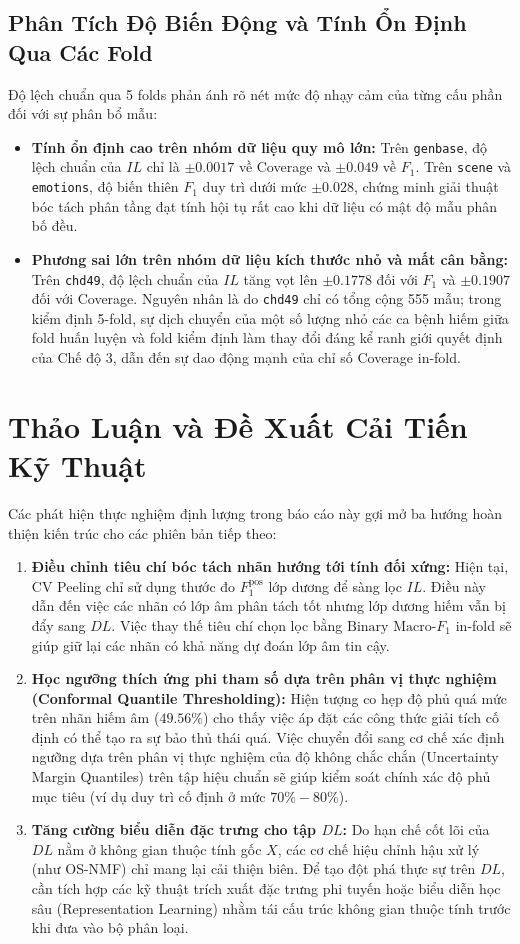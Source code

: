 \documentclass[10pt,a4paper]{article}
\begin{document}
\subsection{Phân Tích Độ Biến Động và Tính Ổn Định Qua Các Fold}
Độ lệch chuẩn qua 5 folds phản ánh rõ nét mức độ nhạy cảm của từng cấu phần đối với sự phân bổ mẫu:
\begin{itemize}[leftmargin=*]
    \item \textbf{Tính ổn định cao trên nhóm dữ liệu quy mô lớn:} Trên \texttt{genbase}, độ lệch chuẩn của $IL$ chỉ là $\pm 0.0017$ về Coverage và $\pm 0.049$ về $F_1$. Trên \texttt{scene} và \texttt{emotions}, độ biến thiên $F_1$ duy trì dưới mức $\pm 0.028$, chứng minh giải thuật bóc tách phân tầng đạt tính hội tụ rất cao khi dữ liệu có mật độ mẫu phân bố đều.
    \item \textbf{Phương sai lớn trên nhóm dữ liệu kích thước nhỏ và mất cân bằng:} Trên \texttt{chd49}, độ lệch chuẩn của $IL$ tăng vọt lên $\pm 0.1778$ đối với $F_1$ và $\pm 0.1907$ đối với Coverage. Nguyên nhân là do \texttt{chd49} chỉ có tổng cộng 555 mẫu; trong kiểm định 5-fold, sự dịch chuyển của một số lượng nhỏ các ca bệnh hiếm giữa fold huấn luyện và fold kiểm định làm thay đổi đáng kể ranh giới quyết định của Chế độ 3, dẫn đến sự dao động mạnh của chỉ số Coverage in-fold.
\end{itemize}

\section{Thảo Luận và Đề Xuất Cải Tiến Kỹ Thuật}

Các phát hiện thực nghiệm định lượng trong báo cáo này gợi mở ba hướng hoàn thiện kiến trúc cho các phiên bản tiếp theo:
\begin{enumerate}[leftmargin=*]
    \item \textbf{Điều chỉnh tiêu chí bóc tách nhãn hướng tới tính đối xứng:} Hiện tại, CV Peeling chỉ sử dụng thước đo $F_1^{\text{pos}}$ lớp dương để sàng lọc $IL$. Điều này dẫn đến việc các nhãn có lớp âm phân tách tốt nhưng lớp dương hiếm vẫn bị đẩy sang $DL$. Việc thay thế tiêu chí chọn lọc bằng $\text{Binary Macro-}F_1$ in-fold sẽ giúp giữ lại các nhãn có khả năng dự đoán lớp âm tin cậy.
    \item \textbf{Học ngưỡng thích ứng phi tham số dựa trên phân vị thực nghiệm (Conformal Quantile Thresholding):} Hiện tượng co hẹp độ phủ quá mức trên nhãn hiếm âm ($49.56\%$) cho thấy việc áp đặt các công thức giải tích cố định có thể tạo ra sự bảo thủ thái quá. Việc chuyển đổi sang cơ chế xác định ngưỡng dựa trên phân vị thực nghiệm của độ không chắc chắn (Uncertainty Margin Quantiles) trên tập hiệu chuẩn sẽ giúp kiểm soát chính xác độ phủ mục tiêu (ví dụ duy trì cố định ở mức $70\% - 80\%$).
    \item \textbf{Tăng cường biểu diễn đặc trưng cho tập $DL$:} Do hạn chế cốt lõi của $DL$ nằm ở không gian thuộc tính gốc $X$, các cơ chế hiệu chỉnh hậu xử lý (như OS-NMF) chỉ mang lại cải thiện biên. Để tạo đột phá thực sự trên $DL$, cần tích hợp các kỹ thuật trích xuất đặc trưng phi tuyến hoặc biểu diễn học sâu (Representation Learning) nhằm tái cấu trúc không gian thuộc tính trước khi đưa vào bộ phân loại.
\end{enumerate}
\end{document}
